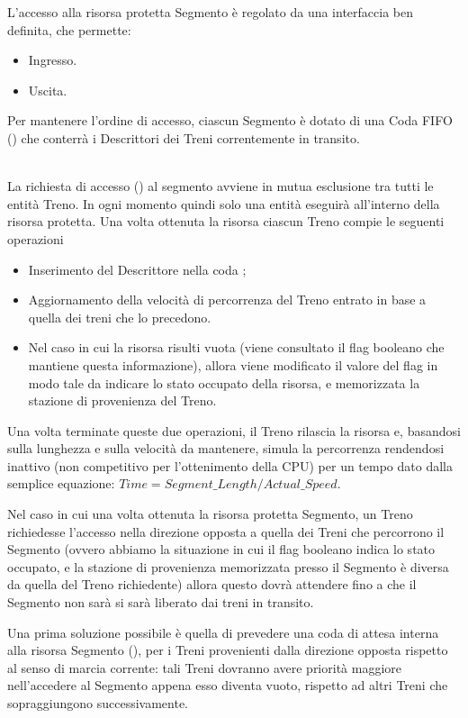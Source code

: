 		L'accesso alla risorsa protetta Segmento è regolato da una interfaccia ben definita, che permette:
			\begin{itemize}
				\item Ingresso.
				\item Uscita.
			\end{itemize}
		Per mantenere l'ordine di accesso, ciascun Segmento è dotato di una Coda FIFO () che conterrà i Descrittori dei Treni correntemente in transito.
		\begin{description}
			\item {} \\
			La richiesta di accesso () al segmento avviene in mutua esclusione tra tutti le entità Treno. In ogni momento quindi solo una entità eseguirà all'interno della risorsa protetta. Una volta ottenuta la risorsa ciascun Treno compie le seguenti operazioni
			 \begin{itemize}
			 	\item Inserimento del Descrittore nella coda ;
			 	\item Aggiornamento della velocità di percorrenza del Treno entrato in base a quella dei treni che lo precedono.
			 	\item Nel caso in cui la risorsa risulti vuota (viene consultato il flag booleano che mantiene questa informazione), allora viene modificato il valore del flag in modo tale da indicare lo stato occupato della risorsa, e memorizzata la stazione di provenienza del Treno.
			\end{itemize}
			Una volta terminate queste due operazioni, il Treno rilascia la risorsa e, basandosi sulla lunghezza e sulla velocità da mantenere, simula la percorrenza rendendosi inattivo (non competitivo per l'ottenimento della CPU) per un tempo dato dalla semplice equazione: $ Time = Segment\_Length / Actual\_Speed $.
			
			Nel caso in cui una volta ottenuta la risorsa protetta Segmento, un Treno richiedesse l'accesso nella direzione opposta a quella dei Treni che percorrono il Segmento (ovvero abbiamo la situazione in cui il flag booleano indica lo stato occupato, e la stazione di provenienza memorizzata presso il Segmento è diversa da quella del Treno richiedente) allora questo dovrà attendere fino a che il Segmento non sarà si sarà liberato dai treni in transito.
			
			Una prima soluzione possibile è quella di prevedere una coda di attesa interna alla risorsa Segmento (), per i Treni provenienti dalla direzione opposta rispetto al senso di marcia corrente: tali Treni dovranno avere priorità maggiore nell'accedere al Segmento appena esso diventa vuoto, rispetto ad altri Treni che sopraggiungono successivamente.
			

\end{description}
